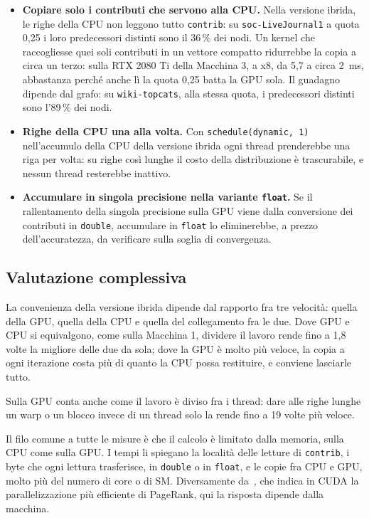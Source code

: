 \documentclass[11pt,a4paper]{article}
\newcommand{\stacco}{\par\medskip\noindent}
\begin{document}
\begin{itemize}
    aver aspettato, gliene toglie.
  \item \textbf{Copiare solo i contributi che servono alla CPU.} Nella
    versione ibrida, le righe della CPU non leggono tutto \texttt{contrib}: su
    \texttt{soc-LiveJournal1} a quota 0,25 i loro predecessori distinti sono
    il 36\,\% dei nodi. Un kernel che raccogliesse quei soli contributi in un
    vettore compatto ridurrebbe la copia a circa un terzo: sulla RTX 2080 Ti
    della Macchina 3, a x8, da 5,7 a circa 2~ms, abbastanza perché anche lì la quota 0,25 batta la GPU sola. Il
    guadagno dipende dal grafo: su \texttt{wiki-topcats}, alla stessa quota, i
    predecessori distinti sono l'89\,\% dei nodi.
  \item \textbf{Righe della CPU una alla volta.} Con
    \texttt{schedule(dynamic,~1)} nell'accumulo della CPU della versione
    ibrida ogni thread prenderebbe
    una riga per volta: su righe così lunghe il costo della distribuzione è
    trascurabile, e nessun thread resterebbe inattivo.
  \item \textbf{Accumulare in singola precisione nella variante
    \texttt{float}.} Se il rallentamento della singola precisione sulla GPU
    viene dalla conversione dei contributi in \texttt{double}, accumulare in
    \texttt{float} lo eliminerebbe, a prezzo dell'accuratezza, da verificare
    sulla soglia di convergenza.
\end{itemize}

\subsection{Valutazione complessiva}
La convenienza della versione ibrida dipende dal
rapporto fra tre velocità: quella della GPU, quella della CPU e quella del
collegamento fra le due. Dove GPU e CPU si equivalgono, come sulla Macchina 1,
dividere il lavoro rende fino a 1,8 volte la migliore delle due da sola; dove
la GPU è molto più veloce, la copia a ogni iterazione costa più di quanto la
CPU possa restituire, e conviene lasciarle tutto.

\stacco
Sulla GPU conta anche come il lavoro è diviso fra i thread: dare alle
righe lunghe un warp o un blocco invece di un thread solo la rende fino a 19
volte più veloce.

\stacco
Il filo comune a tutte le misure è che il calcolo è limitato dalla
memoria, sulla CPU come sulla GPU. I tempi li spiegano la località delle
letture di \texttt{contrib}, i byte che ogni lettura trasferisce, in
\texttt{double} o in \texttt{float}, e le copie fra CPU e GPU, molto più del
numero di core o di SM. Diversamente da~\cite{visali2024}, che indica in CUDA la
parallelizzazione più efficiente di PageRank, qui la risposta dipende dalla
macchina.
\end{document}
